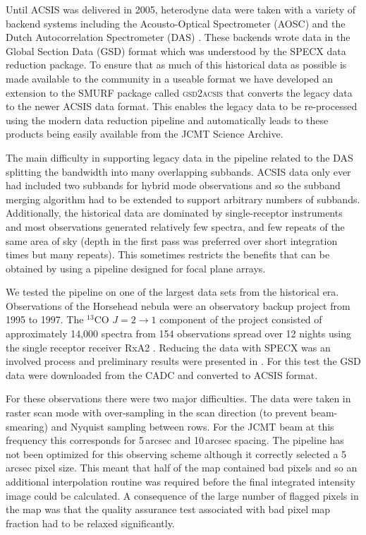 \documentclass[final,authoryear,5p,times,twocolumn]{elsarticle}
\begin{document}
Until ACSIS was delivered in 2005, heterodyne data were taken with a
variety of backend systems including the Acousto-Optical Spectrometer
(AOSC) and the Dutch Autocorrelation Spectrometer (DAS)
\citep{1986SPIE..598..134B}. These backends wrote data in the
Global Section Data (GSD) format \citep[e.g.][]{GSD1999} which was
understood by the SPECX data reduction package. To ensure that as much
of this historical data as possible is made available to the community
in a useable format we have developed an extension to the SMURF
package called \textsc{gsd2acsis} that converts the legacy data to the
newer ACSIS data format. This enables the legacy data to be re-processed using
the modern data reduction pipeline and automatically leads to these
products being easily available from the JCMT Science Archive.

The main difficulty in supporting legacy data in the pipeline related
to the DAS splitting the bandwidth into many overlapping
subbands. ACSIS data only ever had included two subbands for hybrid
mode observations and so the subband merging algorithm had to be
extended to support arbitrary numbers of subbands. Additionally, the
historical data are dominated by single-receptor instruments and most
observations generated relatively few spectra, and few repeats of the
same area of sky (depth in the first pass was preferred over short
integration times but many repeats). This sometimes
restricts the benefits that can be obtained by using a pipeline
designed for focal plane arrays.

We tested the pipeline on one of the largest data sets from the
historical era. Observations of the Horsehead nebula were an
observatory backup project from 1995 to 1997. The $^{13}$CO
$J=2\rightarrow 1$ component of the project consisted of approximately
14,000 spectra from 154 observations spread over 12 nights using the
single receptor receiver RxA2 \citep{1992IJIMW..13..647D}. Reducing
the data with SPECX was an involved process and preliminary results
were presented in \citet{2001AAS...19915601S}. For this test the GSD data were
downloaded from the CADC and converted to ACSIS format.

For these observations there were two major difficulties. The data
were taken in raster scan mode with over-sampling in the scan
direction (to prevent beam-smearing) and Nyquist sampling between
rows. For the JCMT beam at this frequency this corresponds for
5\,arcsec and 10\,arcsec spacing. The pipeline has not been optimized
for this observing scheme although it correctly selected a 5\,arcsec
pixel size. This meant that half of the map contained bad pixels and
so an additional interpolation routine was required before the final
integrated intensity image could be calculated. A consequence of the
large number of flagged pixels in the map was that the quality
assurance test associated with bad pixel map fraction had to be
relaxed significantly.
\end{document}
